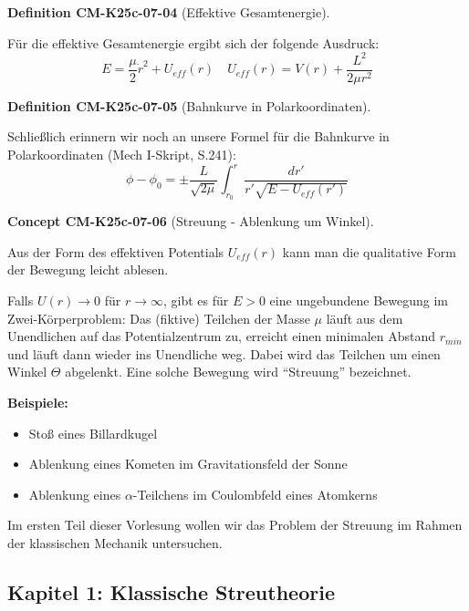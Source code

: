 \documentclass[10pt, letterpaper]{article}
\newcommand{\CustomHeading}[3]{%
  \par\medskip\noindent%
  \textbf{#1 #2} \textnormal{(#3)}.\enskip%
}
\newenvironment{DEF}[2]{\begin{unitbox}\CustomHeading{Definition}{#1}{#2}}{\end{unitbox}}
\newenvironment{CONC}[2]{\begin{unitbox}\CustomHeading{Concept}{#1}{#2}}{\end{unitbox}}
\begin{document}
\begin{DEF}{CM-K25c-07-04}{Effektive Gesamtenergie}
Für die effektive Gesamtenergie ergibt sich der folgende Ausdruck:
$$E = \frac{\mu}{2}\dot{r}^2 + U_{eff}(r)\quad U_{eff}(r) = V(r) + \frac{L^2}{2\mu r^2}$$
\end{DEF}

\begin{DEF}{CM-K25c-07-05}{Bahnkurve in Polarkoordinaten}
Schließlich erinnern wir noch an unsere Formel für die Bahnkurve in Polarkoordinaten (Mech I-Skript, S.241):
$$\phi - \phi_0 = \pm \frac{L}{\sqrt{2\mu}} \int_{r_0}^r \frac{dr'}{r'\sqrt{E-U_{eff}(r')}}$$
\end{DEF}


\begin{CONC}{CM-K25c-07-06}{Streuung - Ablenkung um Winkel}
Aus der Form des effektiven Potentials $U_{eff}(r)$ kann man die qualitative Form der Bewegung leicht ablesen.

\begin{center}
\end{center}
Falls $U(r) \to 0$ für $r \to \infty$, gibt es für $E > 0$ eine ungebundene Bewegung im Zwei-Körperproblem: Das (fiktive) Teilchen der Masse $\mu$ läuft aus dem Unendlichen auf das Potentialzentrum zu, erreicht einen minimalen Abstand $r_{min}$ und läuft dann wieder ins Unendliche weg. Dabei wird das Teilchen um einen Winkel $\Theta$ abgelenkt. Eine solche Bewegung wird ``Streuung'' bezeichnet.

\textbf{Beispiele:}
\begin{itemize}
\item Stoß eines Billardkugel
\item Ablenkung eines Kometen im Gravitationsfeld der Sonne
\item Ablenkung eines $\alpha$-Teilchens im Coulombfeld eines Atomkerns
\end{itemize}
\end{CONC}

Im ersten Teil dieser Vorlesung wollen wir das Problem der Streuung im Rahmen der klassischen Mechanik untersuchen.
\subsection{Kapitel 1: Klassische Streutheorie}
\end{document}
